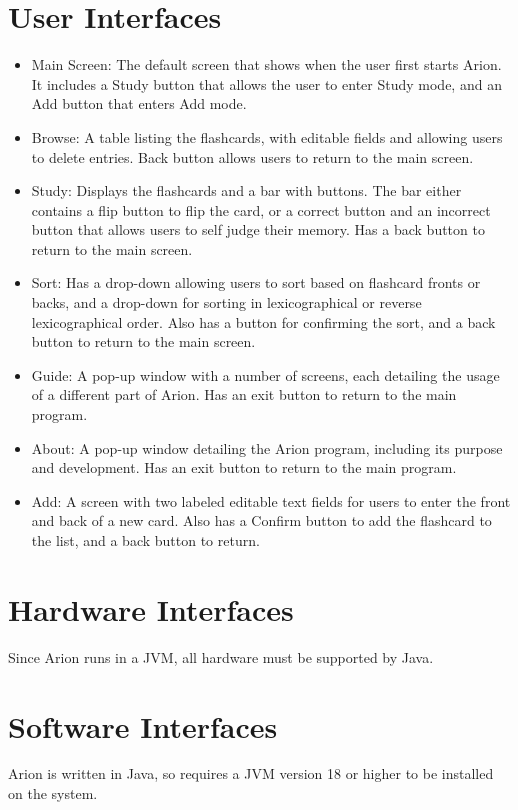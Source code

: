 \documentclass{scrreprt}
\begin{document}
\section{User Interfaces}
\begin{itemize}
    \item
        Main Screen: The default screen that shows when the user first starts Arion.
        It includes a Study button that allows the user to enter Study mode,
        and an Add button that enters Add mode.
    \item 
        Browse: A table listing the flashcards, with editable fields and allowing users to 
        delete entries. Back button allows users to return to the main screen.
    \item
        Study: Displays the flashcards and a bar with buttons. The bar either contains a 
        flip button to flip the card, or a correct button and an incorrect button that
        allows users to self judge their memory. Has a back button to return to 
        the main screen.
    \item 
        Sort: Has a drop-down allowing users to sort based on flashcard fronts or backs,
        and a drop-down for sorting in lexicographical or reverse lexicographical order. 
        Also has a button for confirming the sort, and a back button to return to the main screen.
    \item 
        Guide: A pop-up window with a number of screens, each detailing the usage of a
        different part of Arion. Has an exit button to return to the main program.
    \item 
        About: A pop-up window detailing the Arion program, including its purpose and development.
        Has an exit button to return to the main program.
    \item 
        Add: A screen with two labeled editable text fields for users to enter the front and
        back of a new card. Also has a Confirm button to add the flashcard to the list, and
        a back button to return.
\end{itemize}

\section{Hardware Interfaces}
Since Arion runs in a JVM, all hardware must be supported by Java.

\section{Software Interfaces}
Arion is written in Java, so requires a JVM version 18 or higher to be installed on the system.
\end{document}
